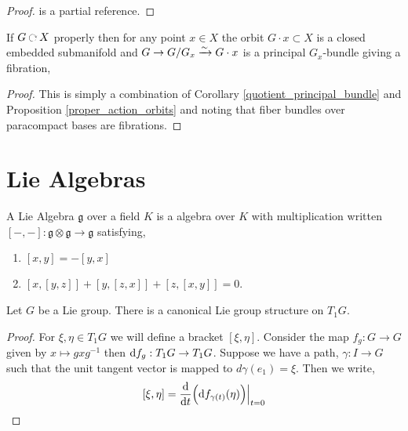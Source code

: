 \documentclass[12pt]{article}
\begin{document}
\begin{proof}
 is a partial reference.
\end{proof}

\begin{prop}
If $G \acts X$ properly then for any point $x \in X$ the orbit $G \cdot x \subset X$ is a closed embedded submanifold and $G \to G / G_x \xrightarrow{\sim} G \cdot x$ is a principal $G_x$-bundle giving a fibration,
\begin{center}
\end{center}
\end{prop}

\begin{proof}
This is simply a combination of Corollary \ref{quotient_principal_bundle} and Proposition \ref{proper_action_orbits} and noting that fiber bundles over paracompact bases are fibrations.
\end{proof}

\section{Lie Algebras}

\newcommand{\g}{\mathfrak{g}}

\begin{definition}
A Lie Algebra $\g$ over a field $K$ is a algebra over $K$ with multiplication written $[- , - ] : \g \otimes \g \to \g$ satisfying,
\begin{enumerate}
\item $[x,y] = -[y,x]$

\item $[x, [y, z]] + [y, [z, x]] + [z, [x, y]] = 0$. 
\end{enumerate}
\end{definition}

\begin{definition}
Let $G$ be a Lie group. There is a canonical Lie group structure on $T_{1} G$.
\end{definition}

\begin{proof}
For $\xi, \eta \in T_{1} G$ we will define a bracket $[\xi, \eta]$. Consider the map $f_g : G \to G$ given by $x \mapsto g x g^{-1}$ then $\mathrm{d}{f}_g : T_{1} G \to T_{1} G$. Suppose we have a path, $\gamma : I \to G$ such that the unit tangent vector is mapped to $d \gamma(e_1) = \xi$. Then we write,
\[ [\xi, \eta] = \frac{\mathrm{d}{}}{\mathrm{d}{t}} \Big( \mathrm{d}{f}_{\gamma(t)}(\eta) \Big) \Big|_{t = 0} \]  
\end{proof}
\end{document}
